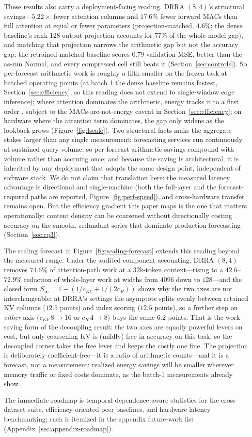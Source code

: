 These results also carry a deployment-facing reading. DRRA $(8,4)$'s
structural savings---$5.22\times$ fewer attention columns and $17.6\%$ fewer
forward MACs than full attention at equal or fewer parameters (projection-matched,
$4.6\%$; the dense baseline's rank-128 output projection accounts for 77\% of the
whole-model gap), and matching that projection narrows the arithmetic gap but
not the accuracy gap: the retrained matched baseline scores $0.79$ validation
MSE, better than the as-run Normal, and every compressed cell still beats it
(Section~\ref{sec:controls}). So
per-forecast arithmetic work is roughly a fifth smaller on the frozen task at
batched operating points (at batch 1 the dense baseline remains fastest,
Section~\ref{sec:efficiency}, so this reading does not extend to single-window
edge inference); where attention dominates the arithmetic, energy tracks it to a
first order \citep{patterson2021carbon,wu2022sustainable}, subject to the
MACs-are-not-energy caveat in Section~\ref{sec:efficiency}; on hardware where the
attention term dominates, the gap only widens as the lookback grows
(Figure~\ref{fig:lscale}). Two structural facts make the aggregate stakes
larger than any single measurement: forecasting services run continuously
at sustained query volume, so per-forecast arithmetic savings compound with
volume rather than accruing once; and because the saving is architectural,
it is inherited by any deployment that adopts the same design point,
independent of software stack. We do not claim that translation here: the
measured latency advantage is directional and single-machine (both the
full-layer and the forecast-required paths are reported,
Figure~\ref{fig:perf-speed}), and
cross-hardware transfer remains open. But the efficiency gradient this
paper maps is the one that matters operationally: content density can be
coarsened without directionally costing accuracy on the smooth, redundant
series that dominate production forecasting (Section~\ref{sec:rq3}).

The scaling forecast in Figure~\ref{fig:scaling-forecast} extends this
reading beyond the measured range. Under the audited component accounting,
DRRA $(8,4)$ removes $74.6\%$ of attention-path work at a $32$k-token
context---rising to a $42.6$--$72.9\%$ reduction of whole-layer work at
widths from $4096$ down to $128$---and the closed form
$S_\infty = 1 - (1/c_{KV} + 1/(2 c_R))$ shows why the two axes are not
interchangeable: at DRRA's settings the asymptote splits evenly between retained
KV columns ($12.5$ points) and index scoring ($12.5$ points), so a further step
on \emph{either} axis ($c_{KV}\,8{\to}16$ or $c_R\,4{\to}8$) buys the same $6.2$
points. That is the work-saving form of the decoupling result: the two axes are
equally powerful levers on cost, but only coarsening KV is (mildly) free in
accuracy on this task, so the decoupled corner takes the free lever and keeps the
costly one fine. The projection is deliberately coefficient-free---it is a ratio of
arithmetic counts---and it is a forecast, not a measurement: realized
energy savings will be smaller wherever memory traffic or fixed costs
dominate, as the batch-1 measurements already show.

The immediate
roadmap is temporal-dependence-aware statistics for the cross-dataset
suite, efficiency-oriented peer baselines, and hardware latency
benchmarking; each is itemized in
the appendix future-work list (Appendix~\ref{sec:appendix-roadmap}).
